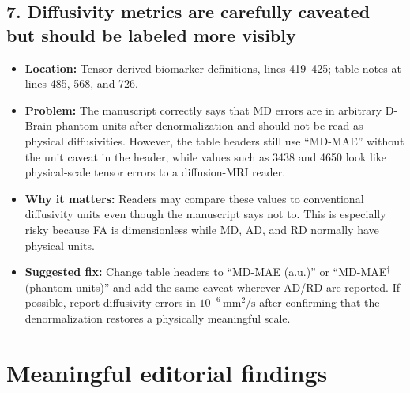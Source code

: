 \documentclass[11pt]{article}
\begin{document}
\subsection*{7. Diffusivity metrics are carefully caveated but should be labeled more visibly}
\begin{itemize}
  \item \textbf{Location:} Tensor-derived biomarker definitions, lines 419--425; table notes at lines 485, 568, and 726.
  \item \textbf{Problem:} The manuscript correctly says that MD errors are in arbitrary D-Brain phantom units after denormalization and should not be read as physical diffusivities. However, the table headers still use ``MD-MAE'' without the unit caveat in the header, while values such as 3438 and 4650 look like physical-scale tensor errors to a diffusion-MRI reader.
  \item \textbf{Why it matters:} Readers may compare these values to conventional diffusivity units even though the manuscript says not to. This is especially risky because FA is dimensionless while MD, AD, and RD normally have physical units.
  \item \textbf{Suggested fix:} Change table headers to ``MD-MAE (a.u.)'' or ``MD-MAE$^\dagger$ (phantom units)'' and add the same caveat wherever AD/RD are reported. If possible, report diffusivity errors in $10^{-6}\,\mathrm{mm^2/s}$ after confirming that the denormalization restores a physically meaningful scale.
\end{itemize}

\section*{Meaningful editorial findings}
\end{document}
